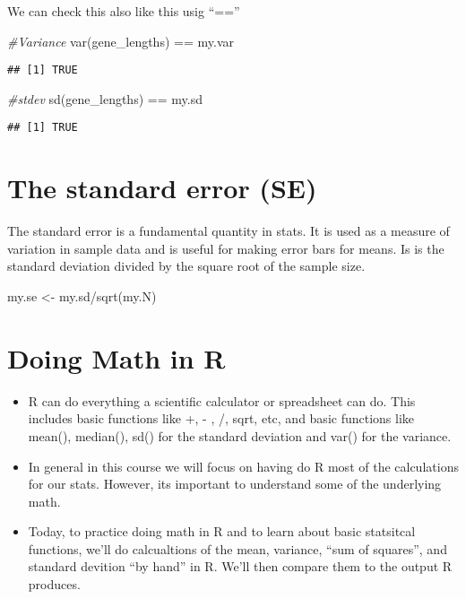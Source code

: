 \documentclass[
]{book}
\newenvironment{Shaded}{\begin{snugshade}}{\end{snugshade}}
\newcommand{\CommentTok}[1]{\textcolor[rgb]{0.56,0.35,0.01}{\textit{#1}}}
\newcommand{\FunctionTok}[1]{\textcolor[rgb]{0.00,0.00,0.00}{#1}}
\newcommand{\NormalTok}[1]{#1}
\newcommand{\OtherTok}[1]{\textcolor[rgb]{0.56,0.35,0.01}{#1}}
\newcommand{\SpecialCharTok}[1]{\textcolor[rgb]{0.00,0.00,0.00}{#1}}
\begin{document}
We can check this also like this usig ``==''

\begin{Shaded}
\begin{Highlighting}[]
\CommentTok{\#Variance}
\FunctionTok{var}\NormalTok{(gene\_lengths) }\SpecialCharTok{==}\NormalTok{ my.var}
\end{Highlighting}
\end{Shaded}

\begin{verbatim}
## [1] TRUE
\end{verbatim}

\begin{Shaded}
\begin{Highlighting}[]
\CommentTok{\#stdev}
\FunctionTok{sd}\NormalTok{(gene\_lengths) }\SpecialCharTok{==}\NormalTok{ my.sd}
\end{Highlighting}
\end{Shaded}

\begin{verbatim}
## [1] TRUE
\end{verbatim}

\hypertarget{the-standard-error-se}{%
\chapter{The standard error (SE)}\label{the-standard-error-se}}

The standard error is a fundamental quantity in stats. It is used as a measure of variation in sample data and is useful for making error bars for means. Is is the standard deviation divided by the square root of the sample size.

\begin{Shaded}
\begin{Highlighting}[]
\NormalTok{my.se }\OtherTok{\textless{}{-}}\NormalTok{ my.sd}\SpecialCharTok{/}\FunctionTok{sqrt}\NormalTok{(my.N)}
\end{Highlighting}
\end{Shaded}

\hypertarget{doing-math-in-r}{%
\chapter{Doing Math in R}\label{doing-math-in-r}}

\begin{itemize}
\item
  R can do everything a scientific calculator or spreadsheet can do. This includes basic functions like +, - , /, sqrt, etc, and basic functions like mean(), median(), sd() for the standard deviation and var() for the variance.
\item
  In general in this course we will focus on having do R most of the calculations for our stats. However, its important to understand some of the underlying math.
\item
  Today, to practice doing math in R and to learn about basic statsitcal functions, we'll do calcualtions of the mean, variance, ``sum of squares'', and standard devition ``by hand'' in R. We'll then compare them to the output R produces.
\end{itemize}
\end{document}
